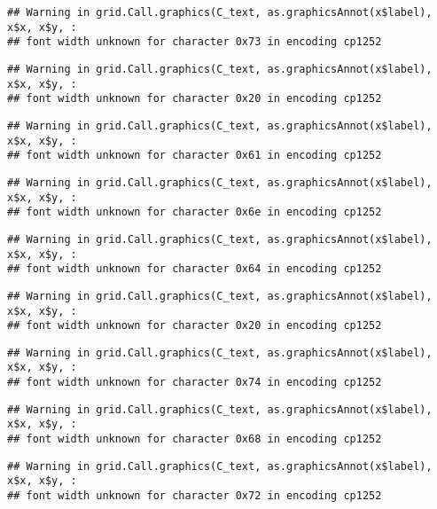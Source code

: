 \documentclass[
]{article}
\begin{document}
\begin{verbatim}
## Warning in grid.Call.graphics(C_text, as.graphicsAnnot(x$label), x$x, x$y, :
## font width unknown for character 0x73 in encoding cp1252
\end{verbatim}

\begin{verbatim}
## Warning in grid.Call.graphics(C_text, as.graphicsAnnot(x$label), x$x, x$y, :
## font width unknown for character 0x20 in encoding cp1252
\end{verbatim}

\begin{verbatim}
## Warning in grid.Call.graphics(C_text, as.graphicsAnnot(x$label), x$x, x$y, :
## font width unknown for character 0x61 in encoding cp1252
\end{verbatim}

\begin{verbatim}
## Warning in grid.Call.graphics(C_text, as.graphicsAnnot(x$label), x$x, x$y, :
## font width unknown for character 0x6e in encoding cp1252
\end{verbatim}

\begin{verbatim}
## Warning in grid.Call.graphics(C_text, as.graphicsAnnot(x$label), x$x, x$y, :
## font width unknown for character 0x64 in encoding cp1252
\end{verbatim}

\begin{verbatim}
## Warning in grid.Call.graphics(C_text, as.graphicsAnnot(x$label), x$x, x$y, :
## font width unknown for character 0x20 in encoding cp1252
\end{verbatim}

\begin{verbatim}
## Warning in grid.Call.graphics(C_text, as.graphicsAnnot(x$label), x$x, x$y, :
## font width unknown for character 0x74 in encoding cp1252
\end{verbatim}

\begin{verbatim}
## Warning in grid.Call.graphics(C_text, as.graphicsAnnot(x$label), x$x, x$y, :
## font width unknown for character 0x68 in encoding cp1252
\end{verbatim}

\begin{verbatim}
## Warning in grid.Call.graphics(C_text, as.graphicsAnnot(x$label), x$x, x$y, :
## font width unknown for character 0x72 in encoding cp1252
\end{verbatim}
\end{document}

